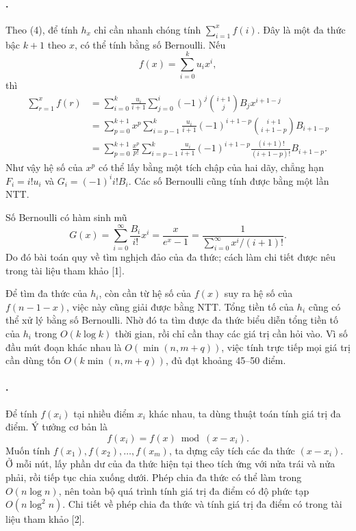 \documentclass[11pt]{article}
\begin{document}
\paragraph{.}
Theo (4), để tính \(h_x\) chỉ cần nhanh chóng tính
\(\sum_{i=1}^{x}f(i)\). Đây là một đa thức bậc \(k+1\) theo \(x\), có thể tính
bằng số Bernoulli. Nếu
\[
  f(x)=\sum_{i=0}^{k}u_i x^i,
\]
thì
\[
\begin{aligned}
\sum_{r=1}^{x} f(r)
&=\sum_{i=0}^{k}\frac{u_i}{i+1}\sum_{j=0}^{i}
  (-1)^j\binom{i+1}{j}B_j x^{i+1-j}\\
&=\sum_{p=0}^{k+1}x^p\sum_{i=p-1}^{k}
  \frac{u_i}{i+1}(-1)^{i+1-p}\binom{i+1}{i+1-p}B_{i+1-p}\\
&=\sum_{p=0}^{k+1}\frac{x^p}{p!}\sum_{i=p-1}^{k}
  \frac{u_i}{i+1}(-1)^{i+1-p}
  \frac{(i+1)!}{(i+1-p)!}B_{i+1-p}.
\end{aligned}
\]
Như vậy hệ số của \(x^p\) có thể lấy bằng một tích chập của hai dãy, chẳng
hạn \(F_i=i!u_i\) và \(G_i=(-1)^i i!B_i\). Các số Bernoulli cũng tính được
bằng một lần NTT.

Số Bernoulli có hàm sinh mũ
\[
  G(x)=\sum_{i=0}^{\infty}\frac{B_i}{i!}x^i
      =\frac{x}{e^x-1}
      =\frac{1}{\sum_{i=0}^{\infty}x^i/(i+1)!}.
\]
Do đó bài toán quy về tìm nghịch đảo của đa thức; cách làm chi tiết được nêu
trong tài liệu tham khảo [1].

Để tìm đa thức của \(h_i\), còn cần từ hệ số của \(f(x)\) suy ra hệ số của
\(f(n-1-x)\), việc này cũng giải được bằng NTT. Tổng tiền tố của \(h_i\) cũng
có thể xử lý bằng số Bernoulli. Nhờ đó ta tìm được đa thức biểu diễn tổng tiền
tố của \(h_i\) trong \(O(k\log k)\) thời gian, rồi chỉ cần thay các giá trị
cần hỏi vào. Vì số đầu mút đoạn khác nhau là \(O(\min(n,m+q))\), việc tính
trực tiếp mọi giá trị cần dùng tốn \(O(k\min(n,m+q))\), đủ đạt khoảng
45--50 điểm.

\paragraph{.}
Để tính \(f(x_i)\) tại nhiều điểm \(x_i\) khác nhau, ta dùng thuật toán tính
giá trị đa điểm. Ý tưởng cơ bản là
\[
  f(x_i)=f(x)\bmod (x-x_i).
\]
Muốn tính \(f(x_1),f(x_2),\ldots,f(x_m)\), ta dựng cây tích các đa thức
\((x-x_i)\). Ở mỗi nút, lấy phần dư của đa thức hiện tại theo tích ứng với
nửa trái và nửa phải, rồi tiếp tục chia xuống dưới. Phép chia đa thức có thể
làm trong \(O(n\log n)\), nên toàn bộ quá trình tính giá trị đa điểm có độ
phức tạp \(O(n\log^2 n)\). Chi tiết về phép chia đa thức và tính giá trị đa
điểm có trong tài liệu tham khảo [2].
\end{document}
